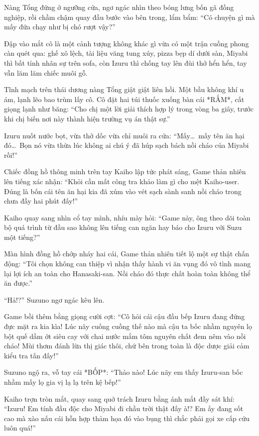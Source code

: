 \documentclass[../main.tex]{subfiles}
\begin{document}
Nàng Tổng đứng ở ngưỡng cửa, ngơ ngác nhìn theo bóng lưng bốn gã đồng nghiệp, rồi chầm chậm quay đầu bước vào bên trong, lẩm bẩm: ``Có chuyện gì mà mấy đứa chạy như bị chó rượt vậy?''

Đập vào mắt cô là một cảnh tượng không khác gì vừa có một trận cuồng phong càn quét qua: ghế xô lệch, tài liệu văng tung xúy, pizza bẹp dí dưới sàn, Miyabi thì bất tỉnh nhân sự trên sofa, còn Izuru thì chống tay lên đùi thở hển hển, tay vẫn lăm lăm chiếc muôi gỗ.

Tĩnh mạch trên thái dương nàng Tổng giật giật liên hồi. Một bầu không khí u ám, lạnh lẽo bao trùm lấy cô. Cô đặt hai túi thuốc xuống bàn cái *RẮM*, cất giọng lạnh như băng: ``Cho chị một lời giải thích hợp lý trong vòng ba giây, trước khi chị biến nơi này thành hiện trường vụ án thật sự.''

Izuru nuốt nước bọt, vừa thở dốc vừa chỉ muôi ra cửa: ``Mấy\dots\ mấy tên ăn hại đó\dots\ Bọn nó vừa thừa lúc không ai chú ý đã húp sạch bách nồi cháo của Miyabi rồi!''

Chiếc đồng hồ thông minh trên tay Kaiho lập tức phát sáng, Game thản nhiên lên tiếng xác nhận: ``Khỏi cần mất công tra khảo làm gì cho mệt Kaiho-user. Đúng là bốn cái tên ăn hại kia đã xúm vào vét sạch sành sanh nồi cháo trong chưa đầy hai phút đấy!''

Kaiho quay sang nhìn cổ tay mình, nhíu mày hỏi: ``Game này, ông theo dõi toàn bộ quá trình từ đầu sao không lên tiếng can ngăn hay báo cho Izuru với Suzu một tiếng?''

Màn hình đồng hồ chớp nháy hai cái, Game thản nhiên tiết lộ một sự thật chấn động: ``Tôi chọn không can thiệp vì nhận thấy hành vi ăn vụng đó vô tình mang lại lợi ích an toàn cho Hanasaki-san. Nồi cháo đó thực chất hoàn toàn không thể ăn được.''

``Hả!?'' Suzuno ngơ ngác kêu lên.

Game bồi thêm bằng giọng cười cợt: ``Cô hỏi cái cậu đầu bếp Izuru đang đứng đực mặt ra kia kìa! Lúc nãy cuống cuồng thế nào mà cậu ta bốc nhầm nguyên lọ bột quế dầm ớt siêu cay với chai nước mắm tôm nguyên chất đem nêm vào nồi cháo! Mùi thơm đánh lừa thị giác thôi, chứ bên trong toàn là độc dược giải cảm kiểu tra tấn đấy!''

Suzuno ngộ ra, vỗ tay cái *BỐP*: ``Thảo nào! Lúc nãy em thấy Izuru-san bốc nhầm mấy lọ gia vị lạ lạ trên kệ bếp!''

Kaiho trợn tròn mắt, quay sang quở trách Izuru bằng ánh mắt đầy sát khí: ``Izuru! Em tính đầu độc cho Miyabi đi chầu trời thật đấy à!? Em ấy đang sốt cao mà xào nấu cái hỗn hợp thảm họa đó vào bụng thì chắc phải gọi xe cấp cứu luôn quá!''
\end{document}
